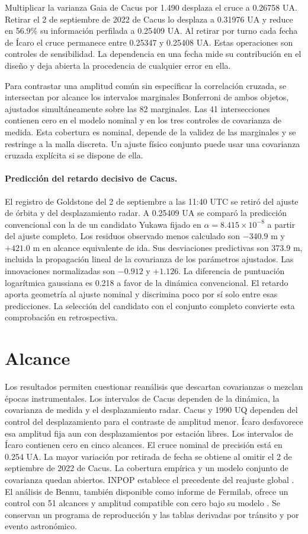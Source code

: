 \documentclass[11pt,a4paper]{article}
\begin{document}
Multiplicar la varianza Gaia de Cacus por 1.490 desplaza el cruce a 0.26758 UA. Retirar el 2 de septiembre de 2022 de Cacus lo desplaza a 0.31976 UA y reduce en 56.9\% su información perfilada a 0.25409 UA. Al retirar por turno cada fecha de Ícaro el cruce permanece entre 0.25347 y 0.25408 UA. Estas operaciones son controles de sensibilidad. La dependencia en una fecha mide su contribución en el diseño y deja abierta la procedencia de cualquier error en ella.

Para contrastar una amplitud común sin especificar la correlación cruzada, se intersectan por alcance los intervalos marginales Bonferroni de ambos objetos, ajustados simultáneamente sobre las 82 marginales. Las 41 intersecciones contienen cero en el modelo nominal y en los tres controles de covarianza de medida. Esta cobertura es nominal, depende de la validez de las marginales y se restringe a la malla discreta. Un ajuste físico conjunto puede usar una covarianza cruzada explícita si se dispone de ella.


\paragraph{Predicción del retardo decisivo de Cacus.}
El registro de Goldstone del 2 de septiembre a las 11:40 UTC \cite{cacusjpl} se retiró del ajuste de órbita y del desplazamiento radar. A 0.25409 UA se comparó la predicción convencional con la de un candidato Yukawa fijado en $\alpha=8.415\times10^{-8}$ a partir del ajuste completo. Los residuos observado menos calculado son $-340.9$ m y $+421.0$ m en alcance equivalente de ida. Sus desviaciones predictivas son 373.9 m, incluida la propagación lineal de la covarianza de los parámetros ajustados. Las innovaciones normalizadas son $-0.912$ y $+1.126$. La diferencia de puntuación logarítmica gaussiana es 0.218 a favor de la dinámica convencional. El retardo aporta geometría al ajuste nominal y discrimina poco por sí solo entre esas predicciones. La selección del candidato con el conjunto completo convierte esta comprobación en retrospectiva.

\section{Alcance}
Los resultados permiten cuestionar reanálisis que descartan covarianzas o mezclan épocas instrumentales. Los intervalos de Cacus dependen de la dinámica, la covarianza de medida y el desplazamiento radar. Cacus y 1990 UQ dependen del control del desplazamiento para el contraste de amplitud menor. Ícaro desfavorece esa amplitud fija aun con desplazamientos por estación libres. Los intervalos de Ícaro contienen cero en cinco alcances. El cruce nominal de precisión está en 0.254 UA. La mayor variación por retirada de fecha se obtiene al omitir el 2 de septiembre de 2022 de Cacus. La cobertura empírica y un modelo conjunto de covarianza quedan abiertos. INPOP establece el precedente del reajuste global \cite{inpop}. El análisis de Bennu, también disponible como informe de Fermilab, ofrece un control con 51 alcances y amplitud compatible con cero bajo su modelo \cite{bennu}. Se conservan un programa de reproducción y las tablas derivadas por tránsito y por evento astronómico.
\end{document}
